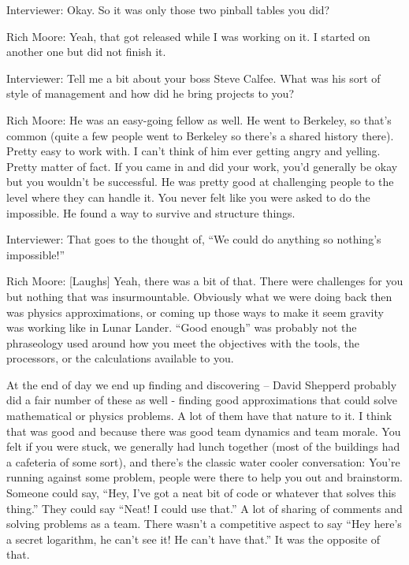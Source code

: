 \textcolor{interviewer}{Interviewer:} Okay. So it was only those two pinball tables you did?

\textcolor{interviewee}{Rich Moore:} Yeah, that got released while I was working on it. I started on another one but did not finish it.

\textcolor{interviewer}{Interviewer:} Tell me a bit about your boss Steve Calfee. What was his sort of style of management and how did he bring projects to you?

\textcolor{interviewee}{Rich Moore:} He was an easy-going fellow as well. He went to Berkeley, so that’s common (quite a few people went to Berkeley so there’s a shared history there). Pretty easy to work with. I can’t think of him ever getting angry and yelling. Pretty matter of fact. If you came in and did your work, you’d generally be okay but you wouldn’t be successful. He was pretty good at challenging people to the level where they can handle it. You never felt like you were asked to do the impossible. He found a way to survive and structure things.

\textcolor{interviewer}{Interviewer:} That goes to the thought of, “We could do anything so nothing's impossible!”

\textcolor{interviewee}{Rich Moore:} [Laughs] Yeah, there was a bit of that. There were challenges for you but nothing that was insurmountable. Obviously what we were doing back then was physics approximations, or coming up those ways to make it seem gravity was working like in Lunar Lander. “Good enough” was probably not the phraseology used around how you meet the objectives with the tools, the processors, or the calculations available to you. 

At the end of day we end up finding and discovering – David Shepperd probably did a fair number of these as well - finding good approximations that could solve mathematical or physics problems. A lot of them have that nature to it. I think that was good and because there was good team dynamics and team morale. You felt if you were stuck, we generally had lunch together (most of the buildings had a cafeteria of some sort), and there’s the classic water cooler conversation: You're running against some problem, people were there to help you out and brainstorm. Someone could say, “Hey, I’ve got a neat bit of code or whatever that solves this thing.” They could say “Neat! I could use that.” A lot of sharing of comments and solving problems as a team. There wasn't a competitive aspect to say “Hey here’s a secret logarithm, he can’t see it! He can’t have that.” It was the opposite of that.

